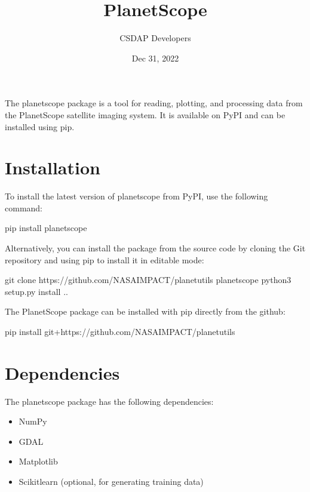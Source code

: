 \documentclass[letterpaper,10pt,english]{sphinxmanual}
\title{PlanetScope}
\date{Dec 31, 2022}
\author{CSDAP Developers}
\begin{document}
\pagestyle{empty}
\sphinxmaketitle
\pagestyle{plain}
\sphinxtableofcontents
\pagestyle{normal}
\label{\detokenize{index::doc}}


\sphinxAtStartPar
The planetscope package is a tool for reading, plotting, and processing data from the PlanetScope satellite imaging system. It is available on PyPI and can be installed using pip.


\chapter{Installation}
\label{\detokenize{gettingstarted:installation}}
\sphinxAtStartPar
To install the latest version of planetscope from PyPI, use the following command:

\begin{sphinxVerbatim}[commandchars=\\\{\}]
pip install planetscope
\end{sphinxVerbatim}

\sphinxAtStartPar
Alternatively, you can install the package from the source code by cloning the Git repository and using pip to install it in editable mode:

\begin{sphinxVerbatim}[commandchars=\\\{\}]
git clone https://github.com/NASA\PYGZhy{}IMPACT/planet\PYGZus{}utils
 planetscope
python3 setup.py install
 ..
\end{sphinxVerbatim}

\sphinxAtStartPar
The PlanetScope package can be installed with pip directly from the github:

\begin{sphinxVerbatim}[commandchars=\\\{\}]
pip install git+https://github.com/NASA\PYGZhy{}IMPACT/planet\PYGZus{}utils
\end{sphinxVerbatim}


\chapter{Dependencies}
\label{\detokenize{gettingstarted:dependencies}}
\sphinxAtStartPar
The planetscope package has the following dependencies:
\begin{itemize}
\item {} 
\sphinxAtStartPar
NumPy

\item {} 
\sphinxAtStartPar
GDAL

\item {} 
\sphinxAtStartPar
Matplotlib

\item {} 
\sphinxAtStartPar
Scikit\sphinxhyphen{}learn (optional, for generating training data)

\end{itemize}
\end{document}
